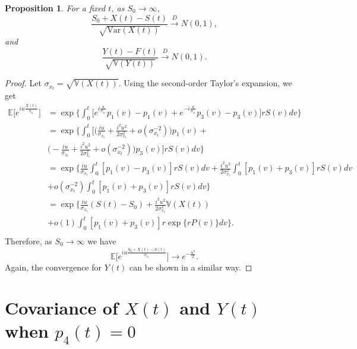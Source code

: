 \documentclass[10pt]{article}
\newtheorem{proposition}{Proposition}
\newcommand{\Var}{\mathbb{V}}
\newcommand{\EE}{\mathbb{E}}
\begin{document}
\begin{proposition}
For a fixed $t$, as $S_0 \rightarrow \infty$,
\begin{equation*}
\frac{S_0+X(t) - S(t)}{\sqrt{\text{Var}(X(t))}} \overset{D}{\longrightarrow} N(0, 1),
\end{equation*}
and
\begin{equation*}
\frac{Y(t) - F(t)}{\sqrt{\Var(Y(t))}} \overset{D}{\longrightarrow} N(0, 1).
\end{equation*}
\end{proposition}
\begin{proof}
Let $\sigma_{x_t} = \sqrt{\Var(X(t))}$. Using the second-order Taylor's expansion, we get
\begin{equation*}
\begin{split}
\EE \Big[e^{iu \frac{X(t)}{\sigma_{x_t}}} \Big] &= \exp \Big\{  \int_0^t \Big[ e^{i \frac{u}{\sigma_{x_t}}}p_1(v) - p_1(v) + e^{-i \frac{u}{\sigma_{x_t}}}p_3(v) - p_3(v)\Big] r S(v) dv\Big\} \\
& = \exp \Big\{ \int_0^t \Big[ \Big( \frac{iu}{\sigma_{x_t}} + \frac{i^2 u^2}{2 \sigma^2_{x_t}} + o(\sigma^{-2}_{x_t}) \Big) p_1(v) + \\
& \Big(- \frac{iu}{\sigma_{x_t}} + \frac{i^2 u^2}{2 \sigma^2_{x_t}} + o(\sigma^{-2}_{x_t}) \Big) p_3(v)  \Big] r S(v) dv\Big\} \\
& = \exp \Big\{ \frac{iu}{\sigma_{x_t}} \int_0^t  [p_1(v) - p_3(v)] r S(v) dv + \frac{i^2u^2}{2\sigma^2_{x_t}}\int_0^t  [p_1(v) + p_3(v)] r S(v) dv \\
& +  o (\sigma^{-2}_{x_t})\int_0^t [p_1(v) + p_3(v)] r S(v) dv \Big\} \\
& = \exp \Big\{ \frac{iu}{\sigma_{x_t}} (S(t)-S_0) + \frac{i^2u^2}{2\sigma^2_{x_t}}\Var(X(t)) \\
& +  o (1)\int_0^t [p_1(v) + p_3(v)] r \exp\{r P(v)\} dv \Big\}. \\
\end{split}
\end{equation*}
Therefore, as $S_0\to \infty$ we have
$$
\EE\Big[ e^{iu \frac{S_0+X(t)-S(t)} {\sigma_{x_t}}} \Big]  \rightarrow e^{- \frac{u^2}{2 }}.
$$
Again, the convergence for $Y(t)$ can be shown in a similar way.
\end{proof}

\section{Covariance of $X(t)$ and $Y(t)$ when $p_4(t) = 0$}
\end{document}
